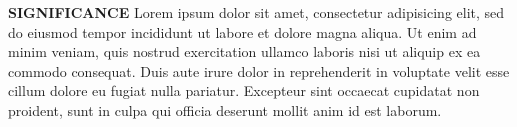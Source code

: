 
{\Large \bf SIGNIFICANCE}
Lorem ipsum dolor sit amet, consectetur adipisicing elit, sed do eiusmod tempor incididunt ut labore et dolore magna aliqua. Ut enim ad minim veniam, quis nostrud exercitation ullamco laboris nisi ut aliquip ex ea commodo consequat. Duis aute irure dolor in reprehenderit in voluptate velit esse cillum dolore eu fugiat nulla pariatur. Excepteur sint occaecat cupidatat non proident, sunt in culpa qui officia deserunt mollit anim id est laborum.\cite{RosendahlSynthesisbiologicalactivity1982}

